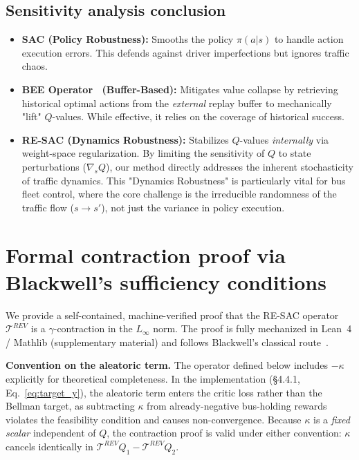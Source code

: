 \subsection{Sensitivity analysis conclusion}
\begin{itemize}
    \item \textbf{SAC (Policy Robustness):} Smooths the policy $\pi(a|s)$ to handle action execution errors. This defends against driver imperfections but ignores traffic chaos.
    \item \textbf{BEE Operator~\cite{Ji2024SeizingSerendipity} (Buffer-Based):} Mitigates value collapse by retrieving historical optimal actions from the \textit{external} replay buffer to mechanically "lift" $Q$-values. While effective, it relies on the coverage of historical success.
    \item \textbf{RE-SAC (Dynamics Robustness):} Stabilizes $Q$-values \textit{internally} via weight-space regularization. By limiting the sensitivity of $Q$ to state perturbations ($\nabla_s Q$), our method directly addresses the inherent stochasticity of traffic dynamics. This "Dynamics Robustness" is particularly vital for bus fleet control, where the core challenge is the irreducible randomness of the traffic flow ($s \to s'$), not just the variance in policy execution.
\end{itemize}

\section{Formal contraction proof via Blackwell's sufficiency conditions}
\label{app:contraction}

We provide a self-contained, machine-verified proof that the RE-SAC operator $\mathcal{T}^{REV}$ is a $\gamma$-contraction in the $L_\infty$ norm.
The proof is fully mechanized in Lean~4 / Mathlib (supplementary material) and follows Blackwell's classical route~\cite{Blackwell1965DiscountedDP}.

\medskip
\noindent\textbf{Convention on the aleatoric term.}
The operator defined below includes $-\kappa$ explicitly for theoretical completeness.
In the implementation (\S4.4.1, Eq.~\eqref{eq:target_y}), the aleatoric term enters the critic loss rather than the Bellman target, as subtracting $\kappa$ from already-negative bus-holding rewards violates the feasibility condition and causes non-convergence.
Because $\kappa$ is a \emph{fixed scalar} independent of $Q$, the contraction proof is valid under either convention: $\kappa$ cancels identically in $\mathcal{T}^{REV} Q_1 - \mathcal{T}^{REV} Q_2$.

